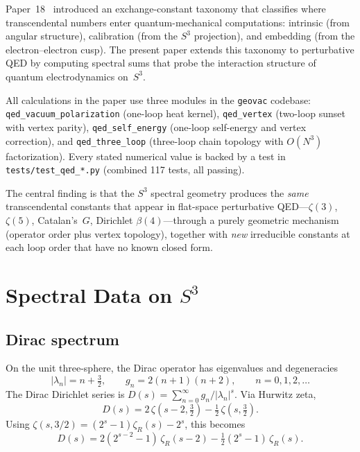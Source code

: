 \documentclass[11pt]{article}
\begin{document}
Paper~18~\cite{paper18} introduced an exchange-constant taxonomy that
classifies where transcendental numbers enter quantum-mechanical
computations: intrinsic (from angular structure), calibration (from the
$S^3$ projection), and embedding (from the electron--electron cusp).
The present paper extends this taxonomy to perturbative QED by computing
spectral sums that probe the interaction structure of quantum
electrodynamics on~$S^3$.

All calculations in the paper use three modules in the \texttt{geovac}
codebase: \texttt{qed\_vacuum\_polarization} (one-loop heat kernel),
\texttt{qed\_vertex} (two-loop sunset with vertex parity),
\texttt{qed\_self\_energy} (one-loop self-energy and vertex correction),
and \texttt{qed\_three\_loop} (three-loop chain topology with $O(N^3)$
factorization).  Every stated numerical value is backed by a test in
\texttt{tests/test\_qed\_*.py} (combined 117 tests, all passing).

The central finding is that the $S^3$ spectral geometry produces the
\emph{same} transcendental constants that appear in flat-space
perturbative QED---$\zeta(3)$, $\zeta(5)$, Catalan's~$G$, Dirichlet
$\beta(4)$---through a purely geometric mechanism (operator order plus
vertex topology), together with \emph{new} irreducible constants at each
loop order that have no known closed form.

\section{Spectral Data on $S^3$}
\label{sec:spectra}

\subsection{Dirac spectrum}

On the unit three-sphere, the Dirac operator has eigenvalues and
degeneracies~\cite{camporesi1996}
\begin{equation}
  |\lambda_n| = n + \tfrac{3}{2}, \qquad
  g_n = 2(n+1)(n+2), \qquad n = 0, 1, 2, \ldots
  \label{eq:dirac_spectrum}
\end{equation}
The Dirac Dirichlet series is
$D(s) = \sum_{n=0}^{\infty} g_n / |\lambda_n|^s$.
Via Hurwitz zeta,
\begin{equation}
  D(s) = 2\,\zeta(s{-}2, \tfrac{3}{2})
       - \tfrac{1}{2}\,\zeta(s, \tfrac{3}{2}).
  \label{eq:dirac_hurwitz}
\end{equation}
Using $\zeta(s, 3/2) = (2^s - 1)\zeta_R(s) - 2^s$, this becomes
\begin{equation}
  D(s) = 2(2^{s-2} - 1)\,\zeta_R(s{-}2)
       - \tfrac{1}{2}(2^s - 1)\,\zeta_R(s).
  \label{eq:hurwitz_discriminant}
\end{equation}
\end{document}
